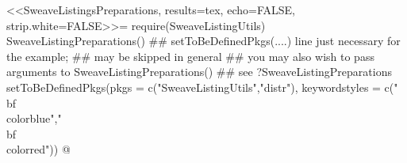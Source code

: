 \RequirePackage{fancyvrb}
\RequirePackage{listings}
%
<<SweaveListingsPreparations, results=tex, echo=FALSE, strip.white=FALSE>>=
require(SweaveListingUtils)
SweaveListingPreparations()
## setToBeDefinedPkgs(....) line just necessary for the example;
##    may be skipped in general
##    you may also wish to pass arguments to SweaveListingPreparations()
##    see ?SweaveListingPreparations
setToBeDefinedPkgs(pkgs = c("SweaveListingUtils","distr"),
                   keywordstyles = c("\\bf\\color{blue}","\\bf\\color{red}"))
@
